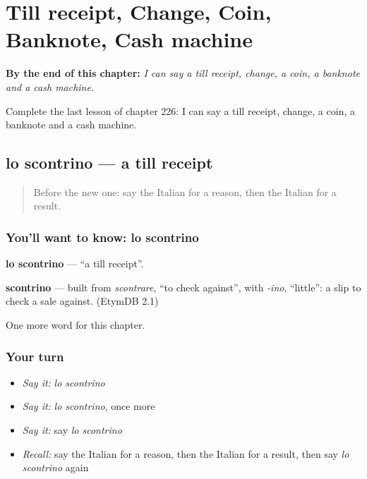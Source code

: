 
\chapter{Till receipt, Change, Coin, Banknote, Cash machine}
\label{ch:it-till-receipt-change-coin-banknote-cash-machine}

\begin{chapteropening}
\textbf{By the end of this chapter:} \emph{I can say a till receipt, change, a coin, a banknote and a cash machine.}

Complete the last lesson of chapter 226: I can say a till receipt, change, a coin, a banknote and a cash machine.
\end{chapteropening}

\section[lo scontrino]{lo scontrino — a till receipt}

\label{lesson:IT-C226-scontrino}



\begin{quote}
Before the new one: say the Italian for a reason, then the Italian for a result.
\end{quote}

\subsection*{You'll want to know: lo scontrino}
\textbf{lo scontrino} — \textquotedblleft{}a till receipt\textquotedblright{}.

\begin{cousinweb}
\textbf{scontrino} — built from \emph{scontrare}, \textquotedblleft{}to check against\textquotedblright{}, with \emph{-ino}, \textquotedblleft{}little\textquotedblright{}: a slip to check a sale against. (EtymDB 2.1)
\end{cousinweb}

\begin{grammarlens}[title={What you've built}]
One more word for this chapter.
\end{grammarlens}

\subsection*{Your turn}
\begin{itemize}
\raggedright
  \item \emph{Say it:} \emph{lo scontrino}
  \item \emph{Say it:} \emph{lo scontrino}, once more
  \item \emph{Say it:} say \emph{lo scontrino}
  \item \emph{Recall:} say the Italian for a reason, then the Italian for a result, then say \emph{lo scontrino} again
\end{itemize}

